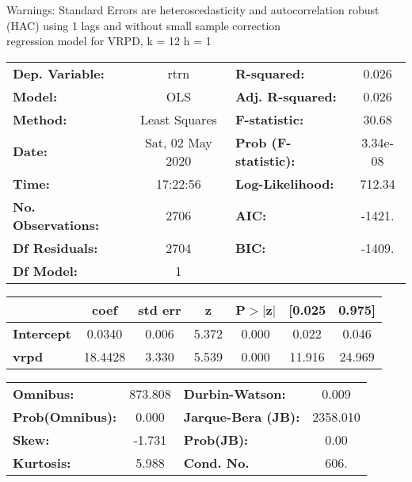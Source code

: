 Warnings: \newline
 [1] Standard Errors are heteroscedasticity and autocorrelation robust (HAC) using 1 lags and without small sample correction\\ 

regression model for VRPD, k = 12 h = 1\begin{center}
\begin{tabular}{lclc}
\toprule
\textbf{Dep. Variable:}    &       rtrn       & \textbf{  R-squared:         } &     0.026   \\
\textbf{Model:}            &       OLS        & \textbf{  Adj. R-squared:    } &     0.026   \\
\textbf{Method:}           &  Least Squares   & \textbf{  F-statistic:       } &     30.68   \\
\textbf{Date:}             & Sat, 02 May 2020 & \textbf{  Prob (F-statistic):} &  3.34e-08   \\
\textbf{Time:}             &     17:22:56     & \textbf{  Log-Likelihood:    } &    712.34   \\
\textbf{No. Observations:} &        2706      & \textbf{  AIC:               } &    -1421.   \\
\textbf{Df Residuals:}     &        2704      & \textbf{  BIC:               } &    -1409.   \\
\textbf{Df Model:}         &           1      & \textbf{                     } &             \\
\bottomrule
\end{tabular}
\begin{tabular}{lcccccc}
                   & \textbf{coef} & \textbf{std err} & \textbf{z} & \textbf{P$> |$z$|$} & \textbf{[0.025} & \textbf{0.975]}  \\
\midrule
\textbf{Intercept} &       0.0340  &        0.006     &     5.372  &         0.000        &        0.022    &        0.046     \\
\textbf{vrpd}      &      18.4428  &        3.330     &     5.539  &         0.000        &       11.916    &       24.969     \\
\bottomrule
\end{tabular}
\begin{tabular}{lclc}
\textbf{Omnibus:}       & 873.808 & \textbf{  Durbin-Watson:     } &    0.009  \\
\textbf{Prob(Omnibus):} &   0.000 & \textbf{  Jarque-Bera (JB):  } & 2358.010  \\
\textbf{Skew:}          &  -1.731 & \textbf{  Prob(JB):          } &     0.00  \\
\textbf{Kurtosis:}      &   5.988 & \textbf{  Cond. No.          } &     606.  \\
\bottomrule
\end{tabular}
\end{center}

